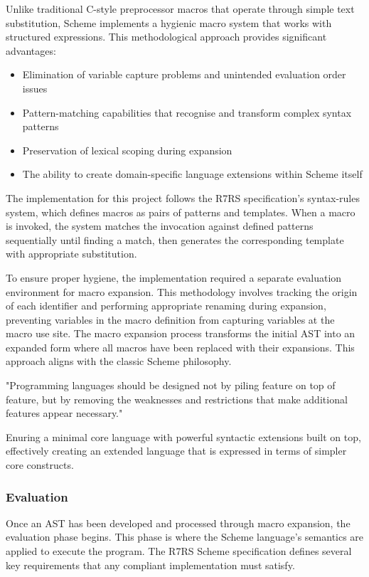 \documentclass[final]{cmpreport_02}
\begin{document}
Unlike traditional C-style preprocessor macros that operate through simple text substitution, Scheme implements a hygienic macro system that works with structured expressions. This methodological approach provides significant advantages:

\begin{itemize}[noitemsep]
    \item Elimination of variable capture problems and unintended evaluation order issues
    \item Pattern-matching capabilities that recognise and transform complex syntax patterns
    \item Preservation of lexical scoping during expansion
    \item The ability to create domain-specific language extensions within Scheme itself
\end{itemize}

The implementation for this project follows the R7RS specification's syntax-rules system, which defines macros as pairs of patterns and templates. When a macro is invoked, the system matches the invocation against defined patterns sequentially until finding a match, then generates the corresponding template with appropriate substitution.\newline

To ensure proper hygiene, the implementation required a separate evaluation environment for macro expansion. This methodology involves tracking the origin of each identifier and performing appropriate renaming during expansion, preventing variables in the macro definition from capturing variables at the macro use site.
The macro expansion process transforms the initial AST into an expanded form where all macros have been replaced with their expansions. This approach aligns with the classic Scheme philosophy.

"Programming languages should be designed not by piling feature on top of feature, but by removing the weaknesses and restrictions that make additional features appear necessary." \cite{r7rs}

Enuring a minimal core language with powerful syntactic extensions built on top, effectively creating an extended language that is expressed in terms of simpler core constructs.
\subsubsection{Evaluation}
Once an AST has been developed and processed through macro expansion, the evaluation phase begins. This phase is where the Scheme language's semantics are applied to execute the program. The R7RS Scheme specification defines several key requirements that any compliant implementation must satisfy.\newline
\end{document}
